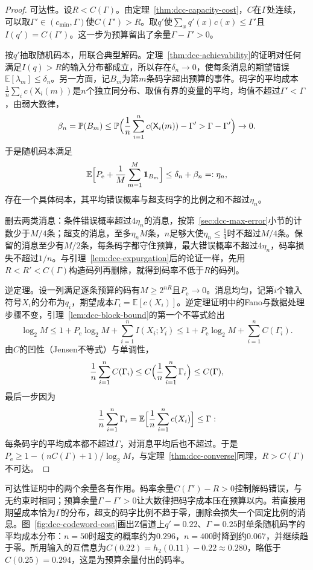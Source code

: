 \begin{proof}
可达性。设$R<C(\Gamma)$。由定理~\ref{thm:dcc-capacity-cost}，$C$在$\Gamma$处连续，可以取$\Gamma'\in(c_{\min},\Gamma)$使$C(\Gamma')>R$。取$q'$使$\sum_xq'(x)c(x)\leq\Gamma'$且$I(q')=C(\Gamma')$。这一步为预算留出了余量$\Gamma-\Gamma'>0$。

按$q'$抽取随机码本，用联合典型解码。定理~\ref{thm:dcc-achievability}的证明对任何满足$I(q)>R$的输入分布都成立，所以存在$\delta_n\to0$，使每条消息的期望错误$\mathbb{E}[\lambda_m]\leq\delta_n$。另一方面，记$B_m$为第$m$条码字超出预算的事件。码字的平均成本$\frac1n\sum_ic(\mathsf{X}_i(m))$是$n$个独立同分布、取值有界的变量的平均，均值不超过$\Gamma'<\Gamma$，由弱大数律，
\[
 \beta_n=\mathbb{P}(B_m)\leq\mathbb{P}\Bigl(\frac1n\sum_{i=1}^{n}c(\mathsf{X}_i(m))-\Gamma'>\Gamma-\Gamma'\Bigr)\to0 .
\]
于是随机码本满足
\[
 \mathbb{E}\Bigl[P_{\mathrm{e}}+\frac1M\sum_{m=1}^{M}\mathbf{1}_{B_m}\Bigr]\leq\delta_n+\beta_n=:\eta_n ,
\]
存在一个具体码本，其平均错误概率与超支码字的比例之和不超过$\eta_n$。

删去两类消息：条件错误概率超过$4\eta_n$的消息，按第~\ref{sec:dcc-max-error}小节的计数少于$M/4$条；超支的消息，至多$\eta_nM$条，$n$足够大使$\eta_n\leq\tfrac14$时不超过$M/4$条。保留的消息至少有$M/2$条，每条码字都守住预算，最大错误概率不超过$4\eta_n$，码率损失不超过$1/n$。与引理~\ref{lem:dcc-expurgation}后的论证一样，先用$R<R'<C(\Gamma)$构造码列再删除，就得到码率不低于$R$的码列。

逆定理。设一列满足逐条预算的码有$M\geq2^{nR}$且$P_{\mathrm{e}}\to0$。消息均匀，记第$i$个输入符号$X_i$的分布为$q_i$，期望成本$\Gamma_i=\mathbb{E}[c(X_i)]$。逆定理证明中的Fano与数据处理步骤不变，引理~\ref{lem:dcc-block-bound}的第一个不等式给出
\[
 \log_2M\leq1+P_{\mathrm{e}}\log_2M+\sum_{i=1}^{n}I(X_i;Y_i)\leq1+P_{\mathrm{e}}\log_2M+\sum_{i=1}^{n}C(\Gamma_i) .
\]
由$C$的凹性（Jensen不等式）与单调性，
\[
 \frac1n\sum_{i=1}^{n}C(\Gamma_i)\leq C\Bigl(\frac1n\sum_{i=1}^{n}\Gamma_i\Bigr)\leq C(\Gamma) ,
\]
最后一步因为
\[
 \frac1n\sum_{i=1}^{n}\Gamma_i=\mathbb{E}\Bigl[\frac1n\sum_{i=1}^{n}c(X_i)\Bigr]\leq\Gamma :
\]
每条码字的平均成本都不超过$\Gamma$，对消息平均后也不超过。于是$P_{\mathrm{e}}\geq1-(nC(\Gamma)+1)/\log_2M$，与定理~\ref{thm:dcc-converse}同理，$R>C(\Gamma)$不可达。
\end{proof}

可达性证明中的两个余量各有作用。码率余量$C(\Gamma')-R>0$控制解码错误，与无约束时相同；预算余量$\Gamma-\Gamma'>0$让大数律把码字成本压在预算以内。若直接用期望成本恰为$\Gamma$的分布，超支的码字比例不趋于零，删除会损失一个固定比例的消息。图~\ref{fig:dcc-codeword-cost}画出Z信道上$q'=0.22$、$\Gamma=0.25$时单条随机码字的平均成本分布：$n=50$时超支的概率约为$0.296$，$n=400$时降到约$0.067$，并继续趋于零。所用输入的互信息为$C(0.22)=h_2(0.11)-0.22\approx0.280$，略低于$C(0.25)=0.294$，这是为预算余量付出的码率。

